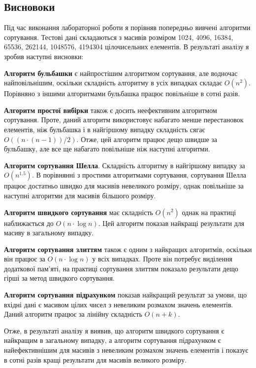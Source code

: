 \documentclass{article}
\begin{document}
\begin{normalsize}
		\section*{Висновоки}
		Під час виконання лабораторної роботи я порівняв попередньо вивчені алгоритми сортування. Тестові дані складаються з масивів розміром 1024, 4096, 16384,  65536, 262144, 1048576, 4194304 цілочисельних елементів. В результаті аналізу я зробив наступні висновки:
		\begin{list}{•}{}
			\item \textbf{Алгоритм бульбашки} є найпростішим алгоритмом сортування, але водночас найповільнішим, оскільки складність алгоритму в усіх випадках складає $O(n^2)$. Порівняно з іншими алгоритмами бульбашка працює повільніше в сотні разів.
			\item \textbf{Алгоритм простої вибірки} також є досить неефективним алгоритмом сортування. Проте, даний алгоритм використовує набагато менше перестановок елементів, ніж бульбашка і в найгіршому випадку складність сягає $O((n\cdot (n-1))/2)$. Отже, цей алгоритм працює дещо швидше за бульбашку, але все ще набагато повільніше ніж наступні алгоритми.
			\item \textbf{Алгоритм сортування Шелла}. Складність алгоритму в найгіршому випадку за $O(n^{1.5})$. В порівнянні з простими алгоритмами сортування, сортування Шелла працює достатньо швидко для масивів невеликого розміру, однак повільніше за наступні алгоритми для масивів більшого розміру.
			\item \textbf{Алгоритм швидкого сортування} має складність $O(n^2)$ однак на практиці наближається до $O(n\cdot \log n)$. Цей алгоритм показав найкращі результати для масиву в загальному випадку.
			\item \textbf{Алгоритм сортування злиттям} також є одним з найкращих алгоритмів, оскільки він працює за $O(n\cdot \log n)$  у всіх випадках. Проте він потребує виділення додаткової пам’яті, на практиці сортування злиттям показало результати дещо гірші за метод швидкого сортування.
			\item \textbf{Алгоритм сортування підрахунком} показав найкращий результат за умови, що вхідні дані є масивом цілих чисел з невеликим розмахом значень елементів. Даний алгоритм працює за лінійну складність $O(n+k)$.
		\end{list}

		Отже, в результаті аналізу я виявив, що алгоритм швидкого сортування є найкращим в загальному випадку, а алгоритм сортування підрахунком є найефективнішим для масивів з невеликим розмахом значень елементів і показує в сотні разів кращі результати для масивів великого розміру.
		
	\end{normalsize}
\end{document}
